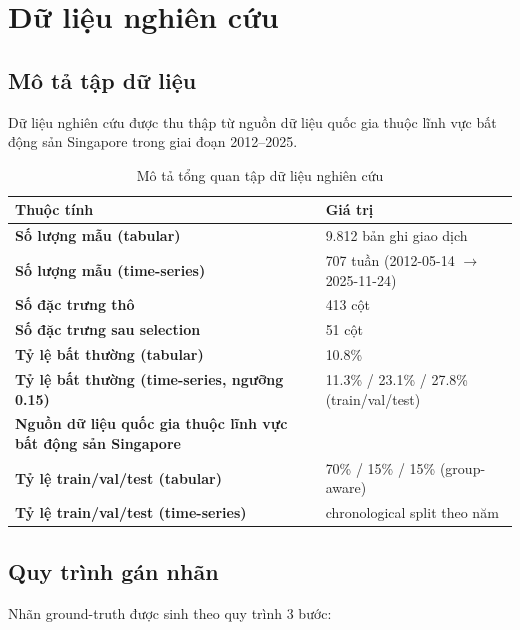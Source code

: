 
\section{Dữ liệu nghiên cứu}

\subsection{Mô tả tập dữ liệu}

Dữ liệu nghiên cứu được thu thập từ nguồn dữ liệu quốc gia thuộc lĩnh vực bất động sản Singapore trong giai đoạn 2012--2025.

\begin{table}[h!]
\centering
\fontsize{13pt}{14.95pt}\selectfont
\caption{Mô tả tổng quan tập dữ liệu nghiên cứu}
\label{tab:mo_ta_du_lieu}
\begin{tabularx}{\textwidth}{|>{\bfseries}p{5cm}|X|}
\hline
\textbf{Thuộc tính} & \textbf{Giá trị} \\
\hline
Số lượng mẫu (tabular) & 9.812 bản ghi giao dịch \\
\hline
Số lượng mẫu (time-series) & 707 tuần (2012-05-14 $\rightarrow$ 2025-11-24) \\
\hline
Số đặc trưng thô & 413 cột \\
\hline
Số đặc trưng sau selection & 51 cột \\
\hline
Tỷ lệ bất thường (tabular) & 10.8\% \\
\hline
Tỷ lệ bất thường (time-series, ngưỡng 0.15) & 11.3\% / 23.1\% / 27.8\% (train/val/test) \\
\hline
Nguồn dữ liệu quốc gia thuộc lĩnh vực bất động sản Singapore \\
\hline
Tỷ lệ train/val/test (tabular) & 70\% / 15\% / 15\% (group-aware) \\
\hline
Tỷ lệ train/val/test (time-series) & chronological split theo năm \\
\hline
\end{tabularx}
\end{table}

\subsection{Quy trình gán nhãn}

Nhãn ground-truth được sinh theo quy trình 3 bước:

